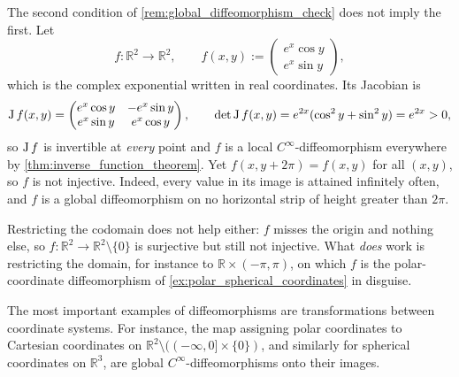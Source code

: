 \begin{example}
\label{ex:local_invertible_not_globally_injective}
The second condition of \cref{rem:global_diffeomorphism_check} does not imply the first. Let
\[f : \mathbb{R}^2 \to \mathbb{R}^2, \qquad
  f(x,y) := \begin{pmatrix} e^x\cos y \\ e^x\sin y \end{pmatrix},\]
which is the complex exponential written in real coordinates. Its Jacobian is
\[\operatorname{J} f(x,y) = \begin{pmatrix} e^x\cos y & -e^x\sin y \\ e^x\sin y & e^x\cos y\end{pmatrix},
  \qquad \det\operatorname{J} f(x,y) = e^{2x}(\cos^2y+\sin^2y) = e^{2x} > 0,\]
so $\operatorname{J} f$ is invertible at \emph{every} point and $f$ is a local $C^\infty$-diffeomorphism
everywhere by \cref{thm:inverse_function_theorem}. Yet $f(x,y+2\pi) = f(x,y)$ for all $(x,y)$, so
$f$ is not injective. Indeed, every value in its image is attained infinitely often, and $f$ is a
global diffeomorphism on no horizontal strip of height greater than $2\pi$.

Restricting the codomain does not help either: $f$ misses the origin and nothing else, so
$f : \mathbb{R}^2 \to \mathbb{R}^2\setminus\{0\}$ is surjective but still not injective. What
\emph{does} work is restricting the domain, for instance to
$\mathbb{R} \times (-\pi,\pi)$, on which $f$ is the polar-coordinate diffeomorphism of
\cref{ex:polar_spherical_coordinates} in disguise.
\end{example}

\begin{example}
\label{ex:polar_spherical_coordinates}
The most important examples of diffeomorphisms are transformations between coordinate systems. For instance, the map assigning polar coordinates to Cartesian coordinates on $\mathbb{R}^2 \setminus ( (-\infty, 0] \times \{0\} )$, and similarly for spherical coordinates on $\mathbb{R}^3$, are global $C^\infty$-diffeomorphisms onto their images.
\end{example}

